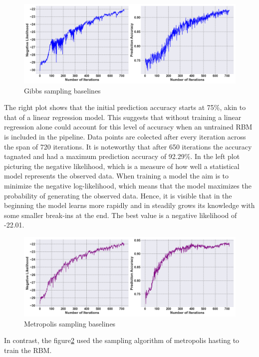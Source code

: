 \begin{figure}[H]
    \centering
    \includegraphics[width=1\linewidth]{graphics/CD_combined_plot.png}
    \caption{Gibbs sampling baselines}
    \label{CD_baselines}
\end{figure}
The right plot shows that the initial prediction accuracy starts at 75\%, akin to that of a linear regression model.
This suggests that without training a linear regression alone could account for this level of accuracy when an untrained \ac{RBM} is included in the pipeline.
Data points are colected after every iteration across the span of 720 iterations. 
It is noteworthy that after 650 iterations the accuracy tagnated and had a maximum prediction accuracy
of 92.29\%. 
In the left plot picturing the negative likelihood, which is a measure of how well a statistical model represents the observed data.
When training a model the aim is to minimize the negative log-likelihood, which means that the model maximizes the probability of generating the observed data.
Hence, it is visible that in the beginning the model learns more rapidly and in steadily grows its knowledge with some smaller break-ins at the end.
The best value is a negative likelihood of -22.01.
\begin{figure}[H]
    \centering
    \includegraphics[width=1\linewidth]{graphics/metropolis_combined_plot.png}
    \caption{Metropolis sampling baselines}
    \label{metropolis_baselines}
\end{figure}
In contrast, the figure\ref{metropolis_baselines} used the sampling algorithm of metropolis hasting to train the \ac{RBM}.
